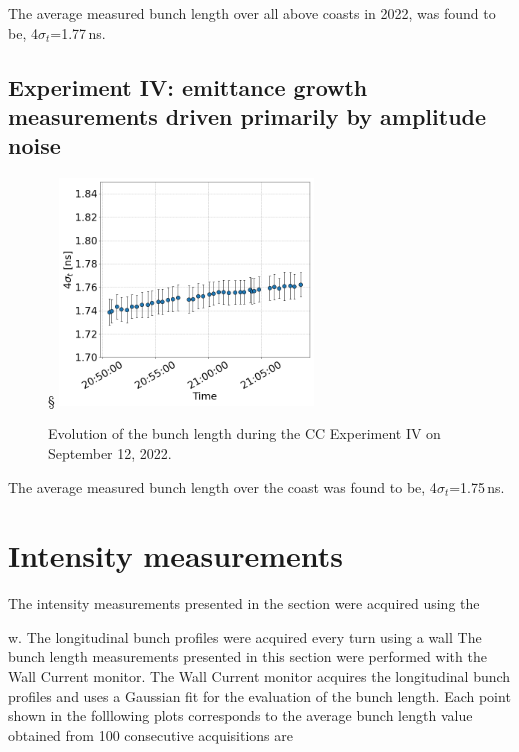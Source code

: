 The average measured bunch length over all above coasts in 2022, was found to be, 4$\sigma_t$=1.77\,ns. 





\subsection{Experiment IV: emittance growth measurements driven primarily by amplitude noise}\label{subsec:2022_exp4_bunch_length}

\begin{figure}[h]
    \centering         §
    \includegraphics[width=0.6\textwidth]{images/app_e/sps_cc_md_12sep_COAST_12.png}
        \caption{Evolution of the bunch length during the CC Experiment IV on September 12, 2022.}
        \label{fig:bunch_length_exp4}
 \end{figure}
 


The average measured bunch length over the coast was found to be, 4$\sigma_t$=1.75\,ns. 



 \section{Intensity measurements}\label{sec:intensity_meas_2022}

 The intensity measurements presented in the section were acquired using the 



 w. The longitudinal bunch profiles were acquired every turn using a wall
 The bunch length measurements presented in this section were performed with the Wall Current monitor. The Wall Current monitor acquires the longitudinal bunch profiles and uses a Gaussian fit for the evaluation of the bunch length. Each point shown in the folllowing plots corresponds to the average bunch length value obtained from 100 consecutive acquisitions are  


